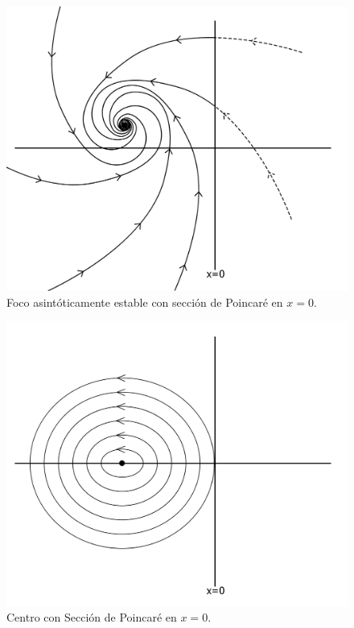 \documentclass[12pt,a4paper]{report} %
\begin{document}
	\begin{figure}[h]
		\centering
		\includegraphics[width=1.1\textwidth,center]{foco3x=0.jpg}
		\caption{Foco asintóticamente estable con sección de Poincaré en $x=0$.}
		\label{fig:foco3}
	\end{figure}\smallskip
	
	\newpage
	
	\begin{figure}[h]
		\centering
		\includegraphics[width=1.1\textwidth,center]{centro2x=0.jpg}
		\caption{Centro con Sección de Poincaré en $x=0$.}
		\label{fig:centro2}
	\end{figure}\smallskip
	
\end{document}

